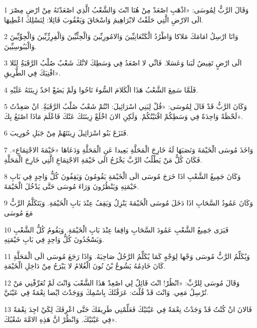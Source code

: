 \par 1 وَقَالَ الرَّبُّ لِمُوسَى: «اذْهَبِ اصْعَدْ مِنْ هُنَا انْتَ وَالشَّعْبُ الَّذِي اصْعَدْتَهُ مِنْ ارْضِ مِصْرَ الَى الارْضِ الَّتِي حَلَفْتُ لابْرَاهِيمَ وَاسْحَاقَ وَيَعْقُوبَ قَائِلا: لِنَسْلِكَ اعْطِيهَا.
\par 2 وَانَا ارْسِلُ امَامَكَ مَلاكا وَاطْرُدُ الْكَنْعَانِيِّينَ وَالامُورِيِّينَ وَالْحِثِّيِّينَ وَالْفِرِزِّيِّينَ وَالْحِوِّيِّينَ وَالْيَبُوسِيِّينَ.
\par 3 الَى ارْضٍ تَفِيضُ لَبَنا وَعَسَلا. فَانِّي لا اصْعَدُ فِي وَسَطِكَ لانَّكَ شَعْبٌ صُلْبُ الرَّقَبَةُِ لِئَلا افْنِيَكَ فِي الطَّرِيقِ».
\par 4 فَلَمَّا سَمِعَ الشَّعْبُ هَذَا الْكَلامَ السُّوءَ نَاحُوا وَلَمْ يَضَعْ احَدٌ زِينَتَهُ عَلَيْهِ.
\par 5 وَكَانَ الرَّبُّ قَدْ قَالَ لِمُوسَى: «قُلْ لِبَنِي اسْرَائِيلَ: انْتُمْ شَعْبٌ صُلْبُ الرَّقَبَةُِ. انْ صَعِدْتُ لَحْظَةً وَاحِدَةً فِي وَسَطِكُمْ افْنَيْتُكُمْ. وَلَكِنِ الانَ اخْلَعْ زِينَتَكَ عَنْكَ فَاعْلَمَ مَاذَا اصْنَعُ بِكَ».
\par 6 فَنَزَعَ بَنُو اسْرَائِيلَ زِينَتَهُمْ مِنْ جَبَلِ حُورِيبَ.
\par 7 وَاخَذَ مُوسَى الْخَيْمَةَ وَنَصَبَهَا لَهُ خَارِجَ الْمَحَلَّةِ بَعِيدا عَنِ الْمَحَلَّةِ وَدَعَاهَا «خَيْمَةَ الاجْتِمَاعِ». فَكَانَ كُلُّ مَنْ يَطْلُبُ الرَّبَّ يَخْرُجُ الَى خَيْمَةِ الاجْتِمَاعِ الَّتِي خَارِجَ الْمَحَلَّةِ.
\par 8 وَكَانَ جَمِيعُ الشَّعْبِ اذَا خَرَجَ مُوسَى الَى الْخَيْمَةِ يَقُومُونَ وَيَقِفُونَ كُلُّ وَاحِدٍ فِي بَابِ خَيْمَتِهِ وَيَنْظُرُونَ وَرَاءَ مُوسَى حَتَّى يَدْخُلَ الْخَيْمَةَ.
\par 9 وَكَانَ عَمُودُ السَّحَابِ اذَا دَخَلَ مُوسَى الْخَيْمَةَ يَنْزِلُ وَيَقِفُ عِنْدَ بَابِ الْخَيْمَةِ. وَيَتَكَلَّمُ الرَّبُّ مَعَ مُوسَى
\par 10 فَيَرَى جَمِيعُ الشَّعْبِ عَمُودَ السَّحَابِ وَاقِفا عِنْدَ بَابِ الْخَيْمَةِ. وَيَقُومُ كُلُّ الشَّعْبِ وَيَسْجُدُونَ كُلُّ وَاحِدٍ فِي بَابِ خَيْمَتِهِ.
\par 11 وَيُكَلِّمُ الرَّبُّ مُوسَى وَجْها لِوَجْهٍ كَمَا يُكَلِّمُ الرَّجُلُ صَاحِبَهُ. وَاذَا رَجَعَ مُوسَى الَى الْمَحَلَّةِ كَانَ خَادِمُهُ يَشُوعُ بْنُ نُونَ الْغُلامُ لا يَبْرَحُ مِنْ دَاخِلِ الْخَيْمَةِ.
\par 12 وَقَالَ مُوسَى لِلرَّبِّ: «انْظُرْ! انْتَ قَائِلٌ لِي اصْعِدْ هَذَا الشَّعْبَ وَانْتَ لَمْ تُعَرِّفْنِي مَنْ تُرْسِلُ مَعِي. وَانْتَ قَدْ قُلْتَ: عَرَفْتُكَ بِاسْمِكَ وَوَجَدْتَ ايْضا نِعْمَةً فِي عَيْنَيَّ.
\par 13 فَالانَ انْ كُنْتُ قَدْ وَجَدْتُ نِعْمَةً فِي عَيْنَيْكَ فَعَلِّمْنِي طَرِيقَكَ حَتَّى اعْرِفَكَ لِكَيْ اجِدَ نِعْمَةً فِي عَيْنَيْكَ. وَانْظُرْ انَّ هَذِهِ الامَّةَ شَعْبُكَ».
